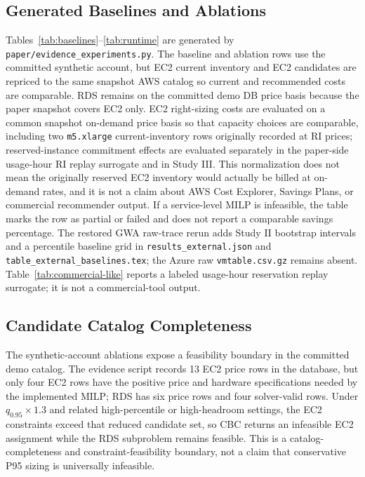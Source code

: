 \documentclass[conference]{IEEEtran}
\begin{document}
\subsection{Generated Baselines and Ablations}
Tables~\ref{tab:baselines}--\ref{tab:runtime} are generated by
\texttt{paper/evidence\_experiments.py}. The baseline and ablation rows use
the committed synthetic account, but EC2 current inventory and EC2 candidates
are repriced to the same snapshot AWS catalog so current and recommended costs
are comparable. RDS remains on the committed demo DB price basis because the
paper snapshot covers EC2 only. EC2 right-sizing costs are evaluated on a
common snapshot on-demand price basis so that capacity choices are
comparable, including two \texttt{m5.xlarge} current-inventory rows originally
recorded at RI prices; reserved-instance commitment effects are evaluated
separately in the paper-side usage-hour RI replay surrogate and in Study III. This
normalization does not mean the originally reserved EC2 inventory would
actually be billed at on-demand rates, and it is not a claim about AWS Cost
Explorer, Savings Plans, or commercial recommender output. If a service-level
MILP is infeasible, the table marks the row as partial or failed and does not
report a comparable savings percentage. The restored GWA raw-trace rerun adds
Study II bootstrap intervals and a percentile baseline grid in
\texttt{results\_external.json} and
\texttt{table\_external\_baselines.tex}; the Azure raw
\texttt{vmtable.csv.gz} remains absent. Table~\ref{tab:commercial-like}
reports a
labeled usage-hour reservation replay surrogate; it is not a commercial-tool
output.

\subsection{Candidate Catalog Completeness}
The synthetic-account ablations expose a feasibility boundary in the committed
demo catalog. The evidence script records 13 EC2 price rows in the database,
but only four EC2 rows have the positive price and hardware specifications
needed by the implemented MILP; RDS has six price rows and four solver-valid
rows. Under $q_{0.95}\times1.3$ and related high-percentile or high-headroom
settings, the EC2 constraints exceed that reduced candidate set, so CBC
returns an infeasible EC2 assignment while the RDS subproblem remains feasible.
This is a catalog-completeness and constraint-feasibility boundary, not a
claim that conservative P95 sizing is universally infeasible.
\end{document}

